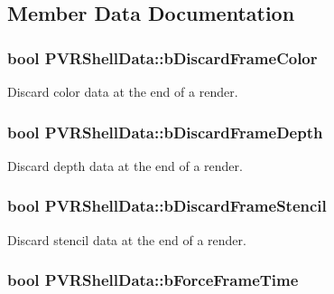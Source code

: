 \subsection{Member Data Documentation}
\hypertarget{struct_p_v_r_shell_data_a44f3ba725085dc2c7e59c568ecbc467d}{
\subsubsection[{b\+Discard\+Frame\+Color}]{\setlength{\rightskip}{0pt plus 5cm}bool P\+V\+R\+Shell\+Data\+::b\+Discard\+Frame\+Color}}\label{struct_p_v_r_shell_data_a44f3ba725085dc2c7e59c568ecbc467d}
Discard color data at the end of a render. \hypertarget{struct_p_v_r_shell_data_a634ac2c58169dce20fcdc4456fc3a346}{
\subsubsection[{b\+Discard\+Frame\+Depth}]{\setlength{\rightskip}{0pt plus 5cm}bool P\+V\+R\+Shell\+Data\+::b\+Discard\+Frame\+Depth}}\label{struct_p_v_r_shell_data_a634ac2c58169dce20fcdc4456fc3a346}
Discard depth data at the end of a render. \hypertarget{struct_p_v_r_shell_data_a968b0e95ccd13de9e311f55eb9199304}{
\subsubsection[{b\+Discard\+Frame\+Stencil}]{\setlength{\rightskip}{0pt plus 5cm}bool P\+V\+R\+Shell\+Data\+::b\+Discard\+Frame\+Stencil}}\label{struct_p_v_r_shell_data_a968b0e95ccd13de9e311f55eb9199304}
Discard stencil data at the end of a render. \hypertarget{struct_p_v_r_shell_data_a102519b3c44090d80d95b863c3bab1ce}{
\subsubsection[{b\+Force\+Frame\+Time}]{\setlength{\rightskip}{0pt plus 5cm}bool P\+V\+R\+Shell\+Data\+::b\+Force\+Frame\+Time}}\label{struct_p_v_r_shell_data_a102519b3c44090d80d95b863c3bab1ce}
